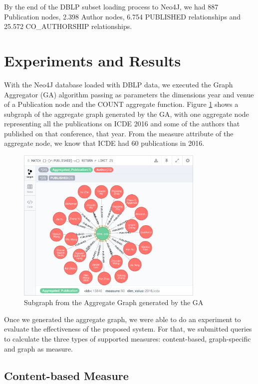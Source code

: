 By the end of the DBLP subset loading process to Neo4J, we had 887 Publication nodes, 2.398 Author nodes, 6.754 PUBLISHED relationships and 25.572 CO\_AUTHORSHIP relationships.

\section{Experiments and Results}

With the Neo4J database loaded with DBLP data, we executed the Graph Aggregator (GA) algorithm passing as parameters the dimensions year and venue of a Publication node and the COUNT aggregate function. Figure \ref{fig:figure33} shows a subgraph of the aggregate graph generated by the GA, with one aggregate node representing all the publications on ICDE 2016 and some of the authors that published on that conference, that year. From the measure attribute of the aggregate node, we know that ICDE had 60 publications in 2016.

\begin{figure}[!h]
\centering
\includegraphics[width=0.8\textwidth]{../aggregate_graph_subgraph.png}
\caption{Subgraph from the Aggregate Graph generated by the GA}
\label{fig:figure33}
\end{figure}

Once we generated the aggregate graph, we were able to do an experiment to evaluate the effectiveness of the proposed system. For that, we submitted queries to calculate the three types of supported measures: content-based, graph-specific and graph as measure.

\subsection{Content-based Measure}

